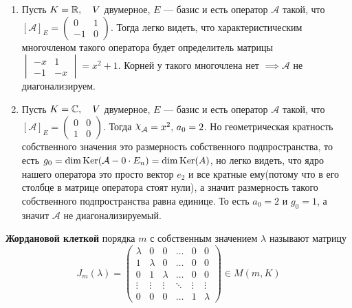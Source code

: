 \documentclass[../main.tex]{subfiles}
\begin{document}
\begin{examples}
  \begin{enumerate}
    \item Пусть $K = \mathbb{R},\quad V$ двумерное, $E$ --- базис и есть оператор $\mathcal{A}$ такой, что $[\mathcal{A}]_E = \begin{pmatrix}
      0 & 1 \\
      -1 & 0
    \end{pmatrix}$. Тогда легко видеть, что характеристическим многочленом такого оператора будет определитель матрицы $
    \begin{vmatrix}
      -x & 1 \\
      -1 & -x
    \end{vmatrix} = x^2 + 1$. Корней у такого многочлена нет $\implies \mathcal{A}$ не диагонализируем.
    \item Пусть $K = \mathbb{C},\quad V$ двумерное, $E$ --- базис и есть оператор $\mathcal{A}$ такой, что $[\mathcal{A}]_E = \begin{pmatrix}
      0 & 0 \\
      1 & 0
    \end{pmatrix}$. Тогда $\rchi_{\mathcal{A}} = x^2,\, a_0 = 2$. Но геометрическая кратность собственного значения это размерность собственного подпространства, то есть $g_0 = \dim \operatorname{Ker} (\mathcal{A} - 0 \cdot E_n) = \dim \operatorname{Ker}(A)$, но легко видеть, что ядро нашего оператора это просто вектор $e_2$ и все кратные ему(потому что в его столбце в матрице оператора стоят нули), а значит размерность такого собственного подпространства равна единице. То есть $a_0 = 2$ и $g_0 = 1$, а значит $\mathcal{A}$ не диагонализируемый.
  \end{enumerate}
\end{examples}
\begin{definition}
  \textbf{Жордановой клеткой} порядка $m$ с собственным значением $\lambda$ называют матрицу
  \begin{equation*}
    J_m(\lambda)
    =
    \begin{pmatrix}
      \lambda & 0 & 0 & \hdots & 0 & 0 \\
      1 & \lambda & 0 & \hdots & 0 & 0 \\
      0 & 1 & \lambda & \hdots & 0 & 0 \\
      \vdots & \vdots & \vdots & \ddots & \vdots & \vdots \\
      0 & 0 & 0 & \hdots & 1 & \lambda
    \end{pmatrix}
    \in M(m, K)
  \end{equation*}
\end{definition}
\end{document}
